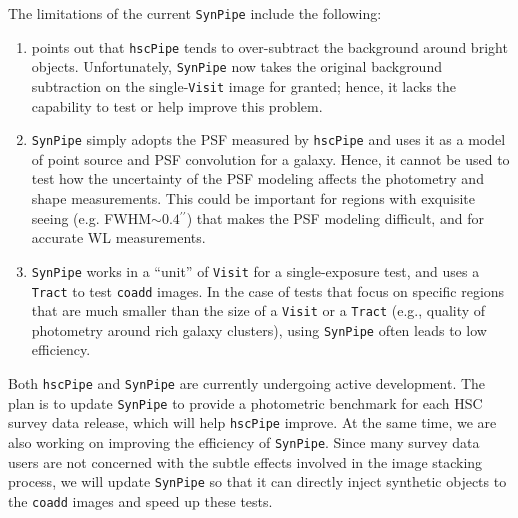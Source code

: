 \documentclass[useamsfonts]{pasj01}
\def\asec{$^{\prime\prime}$}
\def\hscpipe{\texttt{hscPipe}}
\def\synpipe{\texttt{SynPipe}}
\def\coadd{\texttt{coadd}}
\def\tract{\texttt{Tract}}
\def\visit{\texttt{Visit}}
\begin{document}
    The limitations of the current \synpipe{} include the following:

    \begin{enumerate}

        \item \citet{HSCDR1} points out that \hscpipe{} tends to over-subtract the
            background around bright objects.
            Unfortunately, \synpipe{} now takes the original background subtraction on
            the single-\visit{} image for granted; hence, it lacks the capability to
            test or help improve this problem.

        \item  \synpipe{} simply adopts the PSF measured by \hscpipe{} and
            uses it as a model of point source and PSF convolution for a galaxy.
            Hence, it cannot be used to test how the uncertainty of the PSF modeling
            affects the photometry and shape measurements.
            This could be important for regions with exquisite seeing 
            (e.g. FWHM${\sim}0.4$\asec{}) that makes the
            PSF modeling difficult, and for accurate WL measurements.

        \item \synpipe{} works in a ``unit'' of \visit{} for a single-exposure
            test, and uses a \tract{} to test \coadd{} images.
            In the case of tests that focus on specific regions that are much smaller than
            the size of a \visit{} or a \tract{} (e.g., quality of photometry
            around rich galaxy clusters), using \synpipe{} often leads to
            low efficiency.

    \end{enumerate}

    Both \hscpipe{} and \synpipe{} are currently undergoing active development. The plan is to update \synpipe{} to provide a photometric benchmark for
    each HSC survey data release, which will help \hscpipe{} improve.
    At the same time, we are also working on improving the efficiency of \synpipe{}.
    Since many survey data users are not concerned with the subtle effects involved in the image stacking process, we will update \synpipe{} so that it can directly inject synthetic objects to the \coadd{} images and speed up these tests.

\end{document}
